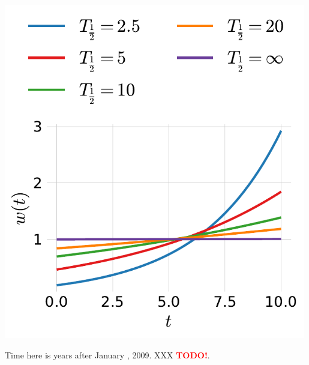 \documentclass[a4paper, twoside, nobib]{tufte-book}
\newcommand{\TODO}{\textcolor{red}{\bf TODO!}\xspace}
\begin{document}
\begin{marginfigure}
  \includegraphics[width=0.99\textwidth]{figures/housing/Villa_v18_cut_all_Ncols_all_half_life_weights.pdf}
  \caption[XXX ]
    {Time here is years after January , 2009. XXX \TODO. 
    }
  \label{fig:h:half-life}
\end{marginfigure}
\end{document}
